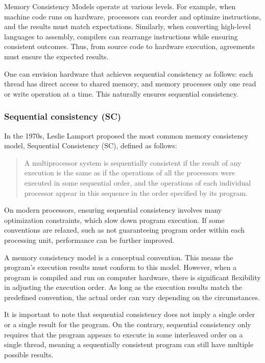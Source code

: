 \documentclass[fontsize=10pt, oneside]{scrartcl}
\begin{document}
Memory Consistency Models operate at various levels. For example, when machine code runs on hardware, processors can reorder and optimize instructions, and the results must match expectations. Similarly, when converting high-level languages to assembly, compilers can rearrange instructions while ensuring consistent outcomes. Thus, from source code to hardware execution, agreements must ensure the expected results.

One can envision hardware that achieves sequential consistency as follows: each thread has direct access to shared memory, and memory processes only one read or write operation at a time. This naturally ensures sequential consistency.

\subsubsection{Sequential consistency (SC)}

In the 1970s, Leslie Lamport proposed the most common memory consistency model, Sequential Consistency (SC), defined as follows:

\begin{quote}
A multiprocessor system is sequentially consistent if the result of any execution is the same as if the operations of all the processors were executed in some sequential order, and the operations of each individual processor appear in this sequence in the order specified by its program.
\end{quote}

On modern processors, ensuring sequential consistency involves many optimization constraints, which slow down program execution. If some conventions are relaxed, such as not guaranteeing program order within each processing unit, performance can be further improved.

A memory consistency model is a conceptual convention. This means the program's execution results must conform to this model. However, when a program is compiled and run on computer hardware, there is significant flexibility in adjusting the execution order. As long as the execution results match the predefined convention, the actual order can vary depending on the circumstances.

It is important to note that sequential consistency does not imply a single order or a single result for the program. On the contrary, sequential consistency only requires that the program appears to execute in some interleaved order on a single thread, meaning a sequentially consistent program can still have multiple possible results.
\end{document}

